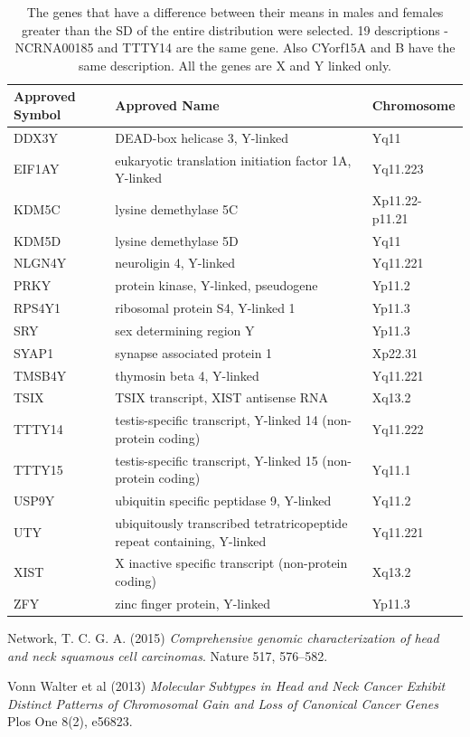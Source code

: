 \documentclass[11pt]{article} %
\begin{document}
\begin{table}[htbp]
   \centering
   \caption{The genes that have a difference between their means in males and females greater than the SD of the entire distribution were selected. 19 descriptions - NCRNA00185 and TTTY14 are the same gene. Also CYorf15A and B have the same description. All the genes are X and Y linked only.} %
   \begin{tabular}{p{1.5cm} p{10cm} p{2.5cm}} %
   \toprule
Approved Symbol & Approved Name & Chromosome \\
\midrule
DDX3Y & DEAD-box helicase 3, Y-linked & Yq11 \\
EIF1AY & eukaryotic translation initiation factor 1A, Y-linked & Yq11.223 \\
KDM5C & lysine demethylase 5C & Xp11.22-p11.21 \\
KDM5D & lysine demethylase 5D & Yq11 \\
NLGN4Y & neuroligin 4, Y-linked & Yq11.221 \\
PRKY & protein kinase, Y-linked, pseudogene & Yp11.2 \\
RPS4Y1 & ribosomal protein S4, Y-linked 1 & Yp11.3 \\
SRY & sex determining region Y & Yp11.3 \\
SYAP1 & synapse associated protein 1 & Xp22.31 \\
TMSB4Y & thymosin beta 4, Y-linked & Yq11.221 \\
TSIX & TSIX transcript, XIST antisense RNA & Xq13.2 \\
TTTY14 & testis-specific transcript, Y-linked 14 (non-protein coding) & Yq11.222 \\
TTTY15 & testis-specific transcript, Y-linked 15 (non-protein coding) & Yq11.1 \\
USP9Y & ubiquitin specific peptidase 9, Y-linked & Yq11.2 \\
UTY & ubiquitously transcribed tetratricopeptide repeat containing, Y-linked & Yq11.221 \\
XIST & X inactive specific transcript (non-protein coding) & Xq13.2 \\
ZFY & zinc finger protein, Y-linked & Yp11.3 \\

\bottomrule
   \end{tabular}
   \label{tab:itc}
\end{table}

\begin{thebibliography}{9}

Network, T. C. G. A. (2015)
\textit{Comprehensive genomic characterization of head and neck squamous cell carcinomas}. 
Nature 517, 576–582.

Vonn Walter et al (2013)
\textit{Molecular Subtypes in Head and Neck Cancer Exhibit
Distinct Patterns of Chromosomal Gain and Loss of
Canonical Cancer Genes}
Plos One 8(2), e56823.

\end{thebibliography}
\end{document}
